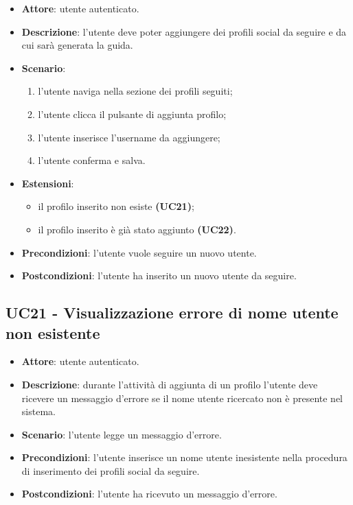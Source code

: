 \begin{itemize}
    \item \textbf{Attore}: utente autenticato.
    \item \textbf{Descrizione}: l'utente deve poter aggiungere dei profili social da seguire e da cui sarà generata la guida.
    \item \textbf{Scenario}:
    \begin{enumerate}
        \item l'utente naviga nella sezione dei profili seguiti;
        \item l'utente clicca il pulsante di aggiunta profilo;
        \item l'utente inserisce l'username da aggiungere;
        \item l'utente conferma e salva.
    \end{enumerate}
    \item \textbf{Estensioni}:
    \begin{itemize}
    	\item il profilo inserito non esiste \textbf{(UC21)};
    	\item il profilo inserito è già stato aggiunto \textbf{(UC22)}.
    \end{itemize} 
    \item \textbf{Precondizioni}: l'utente vuole seguire un nuovo utente.
    \item \textbf{Postcondizioni}: l'utente ha inserito un nuovo utente da seguire.
\end{itemize}

\newpage

\subsection{UC21 - Visualizzazione errore di nome utente non esistente}
\begin{itemize}
    \item \textbf{Attore}: utente autenticato.
    \item \textbf{Descrizione}: durante l'attività di aggiunta di un profilo l'utente deve ricevere un messaggio d'errore se il nome utente ricercato non è presente nel sistema.
    \item \textbf{Scenario}: l'utente legge un messaggio d'errore. 
    \item \textbf{Precondizioni}: l'utente inserisce un nome utente inesistente nella procedura di inserimento dei profili social da seguire.
    \item \textbf{Postcondizioni}: l'utente ha ricevuto un messaggio d'errore.
\end{itemize}


